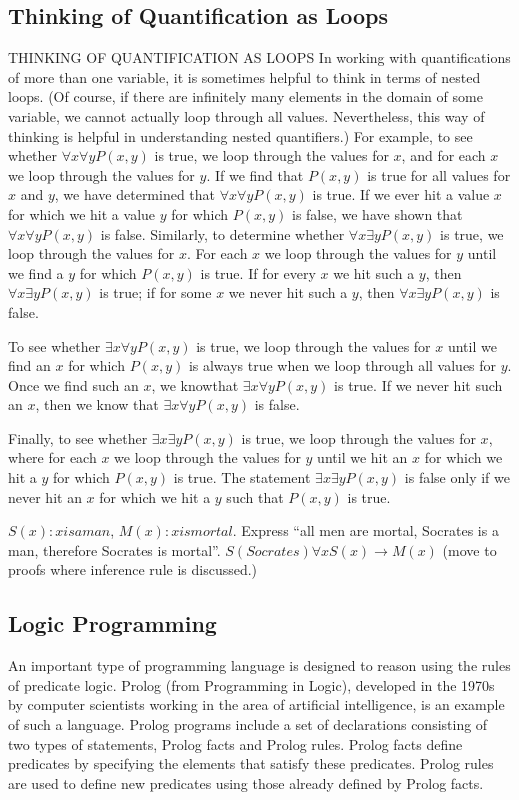 \subsection{Thinking of Quantification as Loops}

THINKING OF QUANTIFICATION AS LOOPS In working with quantifications of more
than one variable, it is sometimes helpful to think in terms of nested loops. (Of course, if there
are infinitely many elements in the domain of some variable, we cannot actually loop through
all values. Nevertheless, this way of thinking is helpful in understanding nested quantifiers.) For
example, to see whether $\forall x \forall yP(x, y)$ is true, we loop through the values for $x$, and for each $x$
we loop through the values for $y$. If we find that $P(x, y)$ is true for all values for $x$ and $y$, we
have determined that $\forall x\forall yP(x, y)$ is true. If we ever hit a value $x$ for which we hit a value $y$
for which $P(x, y)$ is false, we have shown that $\forall x\forall yP(x, y)$ is false.
Similarly, to determine whether $\forall x\exists yP(x, y)$ is true, we loop through the values for $x$.
For each $x$ we loop through the values for $y$ until we find a $y$ for which $P(x, y)$ is true. If for
every $x$ we hit such a $y$, then $\forall x \exists yP(x, y)$ is true; if for some $x$ we never hit such a $y$, then
$\forall x\exists y P(x, y)$ is false.

To see whether $\exists x\forall yP(x, y)$ is true, we loop through the values for $x$ until we find an $x$ for
which $P(x, y)$ is always true when we loop through all values for $y$. Once we find such an $x$, we
knowthat $\exists x\forall yP(x, y)$ is true. If we never hit such an $x$, then we know that $\exists x\forall yP(x, y)$ is false.

Finally, to see whether $\exists x\exists yP(x, y)$ is true, we loop through the values for $x$, where for
each $x$ we loop through the values for $y$ until we hit an $x$ for which we hit a $y$ for which $P(x, y)$
is true. The statement $\exists x\exists yP(x, y)$ is false only if we never hit an $x$ for which we hit a $y$ such that $P(x, y)$ is true.

$S(x): x is a man$, $M(x): x is mortal$. Express ``all men are mortal, Socrates is a man, therefore Socrates is mortal''. $S(Socrates) \forall x S(x) \rightarrow M(x)$  (move to proofs where inference rule is discussed.)


   \subsection {Logic Programming}
An important type of programming language is designed to reason using the rules of predicate
logic. Prolog (from Programming in Logic), developed in the 1970s by computer scientists
working in the area of artificial intelligence, is an example of such a language. Prolog programs
include a set of declarations consisting of two types of statements, Prolog facts and Prolog
rules. Prolog facts define predicates by specifying the elements that satisfy these predicates.
Prolog rules are used to define new predicates using those already defined by Prolog facts.

